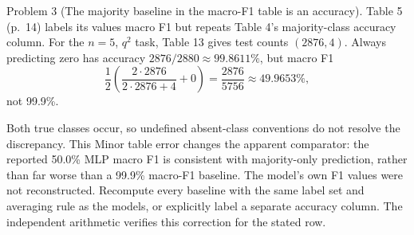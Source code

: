 \documentclass[10pt]{article}
\begin{document}
Problem 3 (The majority baseline in the macro-F1 table is an accuracy).  Table 5 (p. 14) labels its values macro F1 but repeats Table 4’s majority-class accuracy column. For the \(n=5\), \(q^2\) task, Table 13 gives test counts \((2876,4)\). Always predicting zero has accuracy \(2876/2880\approx99.8611\%\), but macro F1 \[\frac12\left(\frac{2\cdot2876}{2\cdot2876+4}+0\right)
 =\frac{2876}{5756}\approx49.9653\%,\] not 99.9\%.\par
Both true classes occur, so undefined absent-class conventions do not resolve the discrepancy. This Minor table error changes the apparent comparator: the reported 50.0\% MLP macro F1 is consistent with majority-only prediction, rather than far worse than a 99.9\% macro-F1 baseline. The model’s own F1 values were not reconstructed. Recompute every baseline with the same label set and averaging rule as the models, or explicitly label a separate accuracy column. The independent arithmetic verifies this correction for the stated row.\par
\end{document}
